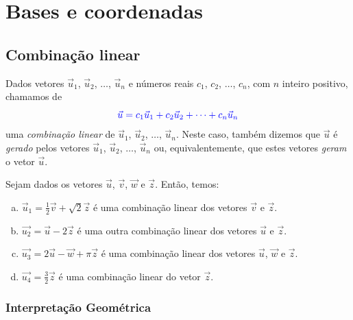
\chapter{Bases e coordenadas}\label{cap_base}

\section{Combinação linear}\label{cap_base_sec_comblin}

Dados vetores $\vec{u}_1$, $\vec{u}_2$, $\dotsc$, $\vec{u}_n$ e números reais $c_1$, $c_2$, $\dotsc$, $c_n$, com $n$ inteiro positivo, chamamos de
\begin{equation}
  {\color{blue}\vec{u} = c_1\vec{u}_1 + c_2\vec{u}_2 + \cdots + c_n\vec{u}_n}
\end{equation}
uma \emph{combinação linear} de $\vec{u}_1$, $\vec{u}_2$, $\dotsc$, $\vec{u}_n$. Neste caso, também dizemos que $\vec{u}$ é \emph{gerado} pelos vetores $\vec{u}_1$, $\vec{u}_2$, $\dotsc$, $\vec{u}_n$ ou, equivalentemente, que estes vetores \emph{geram} o vetor $\vec{u}$.

\begin{ex}\label{cap_base_sec_comblin:ex:comblinear}
  Sejam dados os vetores $\vec{u}$, $\vec{v}$, $\vec{w}$ e $\vec{z}$. Então, temos:
  \begin{enumerate}[a)]
  \item $\vec{u}_1 = \frac{1}{2}\vec{v} + \sqrt{2}\vec{z}$ é uma combinação linear dos vetores $\vec{v}$ e $\vec{z}$.
  \item $\vec{u_2} = \vec{u} - 2\vec{z}$ é uma outra combinação linear dos vetores $\vec{u}$ e $\vec{z}$.
  \item $\vec{u_3} = 2\vec{u} - \vec{w} + \pi\vec{z}$ é uma combinação linear dos vetores $\vec{u}$, $\vec{w}$ e $\vec{z}$.
  \item $\vec{u_4} = \frac{3}{2}\vec{z}$ é uma combinação linear do vetor $\vec{z}$.
  \end{enumerate}
\end{ex}

\subsection{Interpretação Geométrica}

